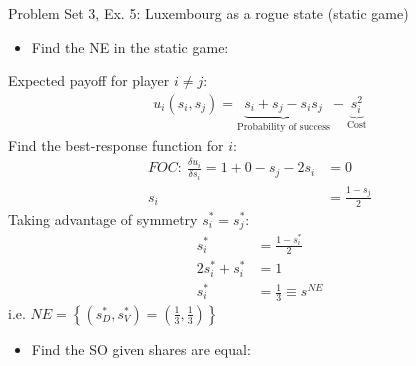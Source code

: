 \begin{frame}{Problem Set 3, Ex. 5: Luxembourg as a rogue state (static game)}
  \begin{multicols}{2}
    \begin{itemize}
      \item[(a)] Find the NE in the static game:
    \end{itemize}
    Expected payoff for player $i\neq j$:
    \begin{align*}
      u_i(s_i,s_j)=\underbrace{s_i+s_j-s_is_j}_\text{Probability of success}-\underbrace{s_i^2}_\text{Cost}
    \end{align*}
    Find the best-response function for $i$:
    \begin{align*}
      FOC:\ \frac{\delta u_i}{\delta s_i}=1+0-s_j-2s_i&=0\\
       s_i&=\frac{1-s_j}{2}
    \end{align*}
    Taking advantage of symmetry $s_i^{*}=s_j^{*}$:
    \begin{align*}
       s_i^{*}&=\frac{1-s_i^{*}}{2}\\
      2s_i^{*}+s_i^{*}&=1\\
       s_i^{*}&=\frac{1}{3}\equiv s^{NE}
    \end{align*}
    i.e. $NE=\left\{(s_D^{*},s_V^{*})=(\frac{1}{3},\frac{1}{3})\right\}$
  \vfill\null\columnbreak
    \begin{itemize}
      \item[(b)] Find the SO given shares are equal:
    \end{itemize}
  \vfill\null
  \end{multicols}
\end{frame}
